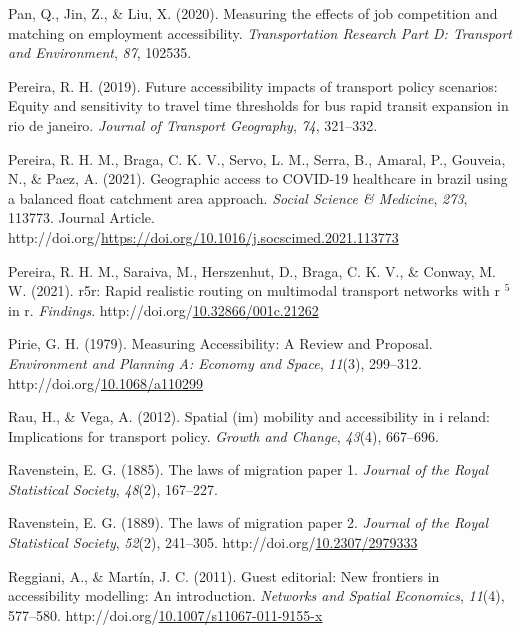 \documentclass[
11pt, %
oneside, %
english, %
singlespacing, %
]{macthesis} %
\newlength{\cslhangindent}
\newenvironment{CSLReferences}[2] %
{\begin{list}{}{%
	\setlength{\itemindent}{0pt}
	\setlength{\leftmargin}{0pt}
	\setlength{\parsep}{0pt}
	\ifodd #1
	\setlength{\leftmargin}{\cslhangindent}
	\setlength{\itemindent}{-1\cslhangindent}
	\fi
	\setlength{\itemsep}{#2\baselineskip}}}
{\end{list}}
\begin{document}
\begin{CSLReferences}{1}{0}
Pan, Q., Jin, Z., \& Liu, X. (2020). Measuring the effects of job competition and matching on employment accessibility. \emph{Transportation Research Part D: Transport and Environment}, \emph{87}, 102535.

Pereira, R. H. (2019). Future accessibility impacts of transport policy scenarios: Equity and sensitivity to travel time thresholds for bus rapid transit expansion in rio de janeiro. \emph{Journal of Transport Geography}, \emph{74}, 321--332.

Pereira, R. H. M., Braga, C. K. V., Servo, L. M., Serra, B., Amaral, P., Gouveia, N., \& Paez, A. (2021). Geographic access to COVID-19 healthcare in brazil using a balanced float catchment area approach. \emph{Social Science \& Medicine}, \emph{273}, 113773. Journal Article. http://doi.org/\url{https://doi.org/10.1016/j.socscimed.2021.113773}

Pereira, R. H. M., Saraiva, M., Herszenhut, D., Braga, C. K. V., \& Conway, M. W. (2021). r5r: Rapid realistic routing on multimodal transport networks with r \(^{\textrm{5}}\) in r. \emph{Findings}. http://doi.org/\href{https://doi.org/10.32866/001c.21262}{10.32866/001c.21262}

Pirie, G. H. (1979). Measuring {Accessibility}: {A} {Review} and {Proposal}. \emph{Environment and Planning A: Economy and Space}, \emph{11}(3), 299--312. http://doi.org/\href{https://doi.org/10.1068/a110299}{10.1068/a110299}

Rau, H., \& Vega, A. (2012). Spatial (im) mobility and accessibility in i reland: Implications for transport policy. \emph{Growth and Change}, \emph{43}(4), 667--696.

Ravenstein, E. G. (1885). The laws of migration paper 1. \emph{Journal of the Royal Statistical Society}, \emph{48}(2), 167--227.

Ravenstein, E. G. (1889). The laws of migration paper 2. \emph{Journal of the Royal Statistical Society}, \emph{52}(2), 241--305. http://doi.org/\href{https://doi.org/10.2307/2979333}{10.2307/2979333}

Reggiani, A., \& Martín, J. C. (2011). Guest editorial: New frontiers in accessibility modelling: An introduction. \emph{Networks and Spatial Economics}, \emph{11}(4), 577--580. http://doi.org/\href{https://doi.org/10.1007/s11067-011-9155-x}{10.1007/s11067-011-9155-x}


\end{CSLReferences}
\end{document}
